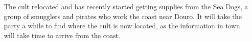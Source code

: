 The cult relocated and has recently started getting supplies from the Sea Dogs, a group of smugglers and pirates who work the coast near Douro.
It will take the party a while to find where the cult is now located, as the information in town will take time to arrive from the coast.
